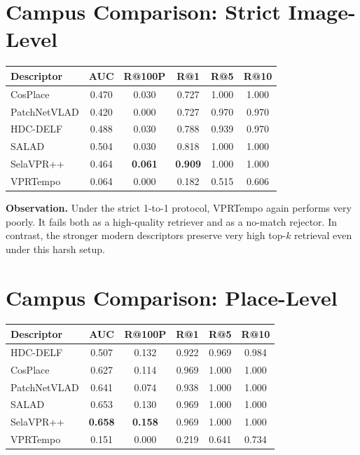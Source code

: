 \documentclass[11pt]{article}
\begin{document}
\section*{Campus Comparison: Strict Image-Level}
\begin{center}
\begin{tabularx}{\textwidth}{L{2.8cm} c c c c c}
\toprule
\textbf{Descriptor} & \textbf{AUC} & \textbf{R@100P} & \textbf{R@1} & \textbf{R@5} & \textbf{R@10} \\
\midrule
CosPlace & 0.470 & 0.030 & 0.727 & 1.000 & 1.000 \\
PatchNetVLAD & 0.420 & 0.000 & 0.727 & 0.970 & 0.970 \\
HDC-DELF & 0.488 & 0.030 & 0.788 & 0.939 & 0.970 \\
SALAD & 0.504 & 0.030 & 0.818 & 1.000 & 1.000 \\
SelaVPR++ & 0.464 & \textbf{0.061} & \textbf{0.909} & 1.000 & 1.000 \\
VPRTempo & 0.064 & 0.000 & 0.182 & 0.515 & 0.606 \\
\bottomrule
\end{tabularx}
\end{center}

\textbf{Observation.} Under the strict 1-to-1 protocol, VPRTempo again performs very poorly. It fails both as a high-quality retriever and as a no-match rejector. In contrast, the stronger modern descriptors preserve very high top-\(k\) retrieval even under this harsh setup.

\section*{Campus Comparison: Place-Level}
\begin{center}
\begin{tabularx}{\textwidth}{L{2.8cm} c c c c c}
\toprule
\textbf{Descriptor} & \textbf{AUC} & \textbf{R@100P} & \textbf{R@1} & \textbf{R@5} & \textbf{R@10} \\
\midrule
HDC-DELF & 0.507 & 0.132 & 0.922 & 0.969 & 0.984 \\
CosPlace & 0.627 & 0.114 & 0.969 & 1.000 & 1.000 \\
PatchNetVLAD & 0.641 & 0.074 & 0.938 & 1.000 & 1.000 \\
SALAD & 0.653 & 0.130 & 0.969 & 1.000 & 1.000 \\
SelaVPR++ & \textbf{0.658} & \textbf{0.158} & 0.969 & 1.000 & 1.000 \\
VPRTempo & 0.151 & 0.000 & 0.219 & 0.641 & 0.734 \\
\bottomrule
\end{tabularx}
\end{center}
\end{document}
